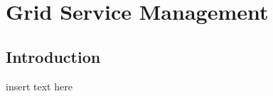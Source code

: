 \graphicspath{{chapt_dutch/}{intro/}{chapt2/}{chapt3/}{chapt4/}{chapt5/}}

\renewcommand\evenpagerightmark{{\scshape\small Chapter 4}}
\renewcommand\oddpageleftmark{{\scshape\small Grid Service Management}}

\renewcommand{\bibname}{References}

\hyphenation{}

\chapter[Grid Service Management]%
 {Grid Service Management}
\label{ch4}

\section{Introduction}

insert text here

\lipsum

\clearpage
%
%




\clearpage{\pagestyle{empty}\cleardoublepage}
